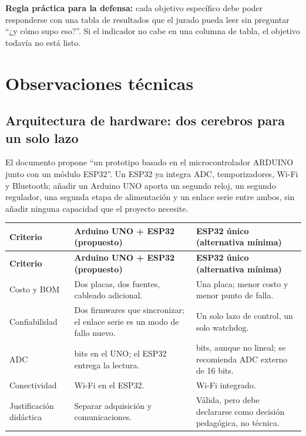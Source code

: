 \documentclass[11pt,a4paper]{article}
\begin{document}
\begin{tcolorbox}[cajaRecomendacion]
\textbf{Regla práctica para la defensa:} cada objetivo específico debe poder responderse con una tabla de resultados que el jurado pueda leer sin preguntar ``¿y cómo supo eso?''. Si el indicador no cabe en una columna de tabla, el objetivo todavía no está listo.
\end{tcolorbox}

\section{Observaciones técnicas}

\subsection{Arquitectura de hardware: dos cerebros para un solo lazo}

El documento propone ``un prototipo basado en el microcontrolador ARDUINO junto con un módulo ESP32''. Un ESP32 ya integra ADC, temporizadores, Wi-Fi y Bluetooth; añadir un Arduino UNO aporta un segundo reloj, un segundo regulador, una segunda etapa de alimentación y un enlace serie entre ambos, sin añadir ninguna capacidad que el proyecto necesite.

\begingroup\small
\begin{longtable}{@{}>{\raggedright\arraybackslash}p{3.0cm} >{\raggedright\arraybackslash}p{5.7cm} >{\raggedright\arraybackslash}p{6.9cm}@{}}
\toprule
\textbf{Criterio} & \textbf{Arduino UNO + ESP32 (propuesto)} & \textbf{ESP32 único (alternativa mínima)} \\
\midrule
\endfirsthead
\toprule
\textbf{Criterio} & \textbf{Arduino UNO + ESP32 (propuesto)} & \textbf{ESP32 único (alternativa mínima)} \\
\midrule
\endhead
Costo y BOM & Dos placas, dos fuentes, cableado adicional. & Una placa; menor costo y menor punto de falla. \\
Confiabilidad & Dos firmwares que sincronizar; el enlace serie es un modo de fallo nuevo. & Un solo lazo de control, un solo watchdog. \\
ADC & 10 bits en el UNO; el ESP32 entrega la lectura. & 12 bits, aunque no lineal; se recomienda ADC externo de 16 bits. \\
Conectividad & Wi-Fi en el ESP32. & Wi-Fi integrado. \\
Justificación didáctica & Separar adquisición y comunicaciones. & Válida, pero debe declararse como decisión pedagógica, no técnica. \\
\bottomrule
\end{longtable}
\endgroup
\end{document}
